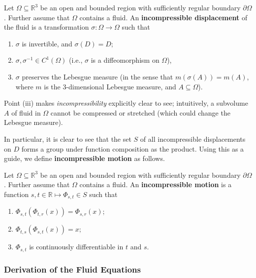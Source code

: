 \documentclass{article}
\begin{document}
\begin{definition}
Let $\Omega \subseteq \mathbb{R}^{3}$ be an open and bounded region with sufficiently regular boundary $\partial \Omega$. Further assume that $\Omega$ contains a fluid. An \textbf{incompressible displacement} of the fluid is a transformation $\sigma: \Omega \to \Omega$ such that \vspace{-0.35cm} 	
\begin{enumerate}[itemsep =-2pt,label = (\roman{*})]
	\item $\sigma$ is invertible, and $\sigma(D) = D$; 
	\item $\sigma, \sigma^{-1} \in C^{1}(\Omega)$ (i.e., $\sigma$ is a diffeomorphism on $\Omega$), 
	\item $\sigma$ preserves the Lebesgue measure (in the sense that $m(\sigma(A)) = m(A)$, where $m$ is the $3$-dimensional Lebesgue measure, and $A \subseteq \Omega$). 
\end{enumerate}
\end{definition}
\begin{remark}
	Point (iii) makes \textit{incompressibility} explicitly clear to see; intuitively, a subvolume $A$ of fluid in $\Omega$ cannot be compressed or stretched (which could change the Lebesgue measure).
\end{remark} 
In particular, it is clear to see that the set $S$ of all incompressible displacements on $D$ forms a group under function composition as the product. Using this as a guide, we define \textbf{incompressible motion} as follows. 
\begin{definition}
	Let $\Omega \subseteq \mathbb{R}^{3}$ be an open and bounded region with sufficiently regular boundary $\partial \Omega$. Further assume that $\Omega$ contains a fluid. An \textbf{incompressible motion} is a function $s, t \in \mathbb{R} \mapsto \Phi_{s, t} \in S$ such that \vspace{-0.25cm} 
	\begin{enumerate}[itemsep =-2pt,label = (\roman{*})]
		\item $\Phi_{s, t}(\Phi_{t,r}(x)) = \Phi_{s, r}(x)$; 
		\item $\Phi_{t, s}(\Phi_{s, t}(x)) = x$; 
		\item $\Phi_{s, t}$ is continuously differentiable in $t$ and $s$. 
	\end{enumerate}
\end{definition}  

\subsubsection{Derivation of the Fluid Equations} 
\end{document}
